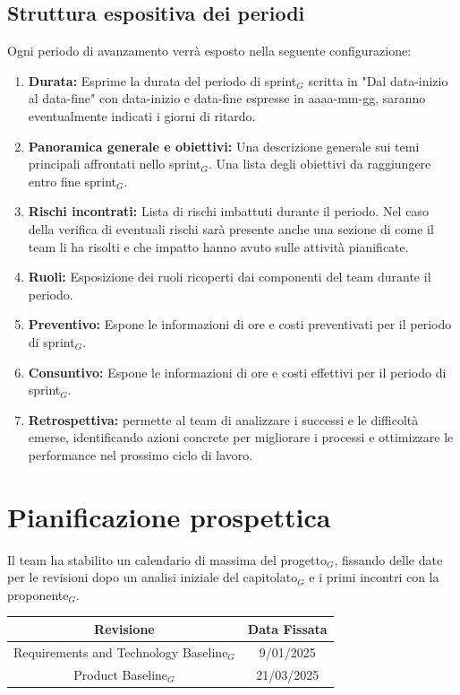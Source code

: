 \documentclass[10pt]{article}
\begin{document}
{\subsection{Struttura espositiva dei periodi} \label{struttura-espositiva}
Ogni periodo di avanzamento verrà esposto nella seguente configurazione:
\begin{enumerate}
 \item \textbf{Durata:} Esprime la durata del periodo di sprint$_G$ scritta in "Dal data-inizio al data-fine" con data-inizio e data-fine espresse in aaaa-mm-gg, saranno eventualmente indicati i giorni di ritardo.
 \item \textbf{Panoramica generale e obiettivi:} Una descrizione generale sui temi principali affrontati nello sprint$_G$. Una lista degli obiettivi da raggiungere entro fine sprint$_G$.
 \item \textbf{Rischi incontrati:} Lista di rischi imbattuti durante il periodo. Nel caso  della verifica di eventuali rischi sarà presente anche una sezione di come il team li ha risolti e che impatto hanno avuto sulle attività pianificate. 
 \item \textbf{Ruoli:} Esposizione dei ruoli ricoperti dai componenti del team durante il periodo.
 \item \textbf{Preventivo:} Espone le informazioni di ore e costi preventivati per il periodo di sprint$_G$.
 \item \textbf{Consuntivo:} Espone le informazioni di ore e costi effettivi per il periodo di sprint$_G$.
 \item \textbf{Retrospettiva:} permette al team di analizzare i successi e le difficoltà emerse, identificando azioni concrete per migliorare i processi e ottimizzare le performance nel prossimo ciclo di lavoro.
\end{enumerate}
\newpage
\clearpage
{}
\section{Pianificazione prospettica}

Il team ha stabilito un calendario di massima del progetto$_G$, fissando delle date per le revisioni dopo un analisi iniziale del capitolato$_G$ e i primi incontri con la proponente$_G$.

\begin{table}[H]
    \centering
    \begin{tabular}{|c|c|}
    \hline
    \rowcolor{gray!25}
    \textbf{Revisione} & \textbf{Data Fissata} \\
    \hline
     Requirements and Technology Baseline$_G$ & 9/01/2025 \\
     \hline
     Product Baseline$_G$ & 21/03/2025 \\
     \hline
     

\end{tabular}
\end{table}}
\end{document}
